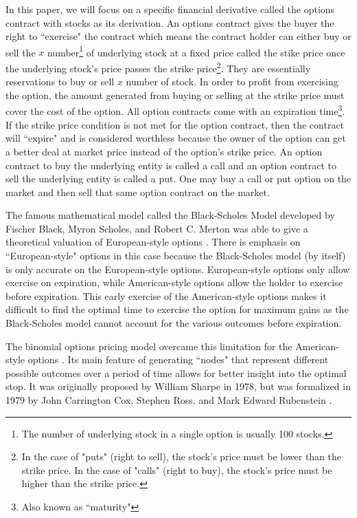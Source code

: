\documentclass[12pt, letterpaper]{article}
\begin{document}
\medskip

In this paper, we will focus on a specific financial derivative called the options contract with stocks as its derivation.
An options contract gives the buyer the right to ``exercise" the contract which means the contract holder can either buy or sell the ${x}$ number\footnote{The number of underlying stock in a single option is usually 100 stocks.} of underlying stock at a fixed price called the stike price once the underlying stock's price passes the strike price\footnote{In the case of "puts" (right to sell), the stock's price must be lower than the strike price. In the case of "calls" (right to buy), the stock's price must be higher than the strike price. }.
They are essentially reservations to buy or sell ${x}$ number of stock.
In order to profit from exercising the option, the amount generated from buying or selling at the strike price must cover the cost of the option.
All option contracts come with an expiration time\footnote{Also known as ``maturity"}.
If the strike price condition is not met for the option contract, then the contract will ``expire" and is considered worthless because the owner of the option can get a better deal at market price instead of the option's strike price.
An option contract to buy the underlying entity is called a call and an option contract to sell the underlying entity is called a put.
One may buy a call or put option on the market and then sell that same option contract on the market.

\medskip

The famous mathematical model called the Black-Scholes Model developed by Fischer Black, Myron Scholes, and Robert C. Merton was able to give a theoretical valuation of European-style options \cite{blackscholesmodelwikipedia}.
There is emphasis on ``European-style" options in this case because the Black-Scholes model (by itself) is only accurate on the European-style options.
European-style options only allow exercise on expiration, while American-style options allow the holder to exercise before expiration.
This early exercise of the American-style options makes it difficult to find the optimal time to exercise the option for maximum gains \cite{blackscholesmodelwikipedia} as the Black-Scholes model cannot account for the various outcomes before expiration. 

\medskip

The binomial options pricing model overcame this limitation for the American-style options \cite{bopmwikipedia}.
Its main feature of generating ``nodes" that represent different possible outcomes over a period of time allows for better insight into the optimal stop.
It was originally proposed by William Sharpe in 1978, but was formalized in 1979 by John Carrington Cox, Stephen Ross, and Mark Edward Rubenstein \cite{bopmwikipedia}.
\end{document}
